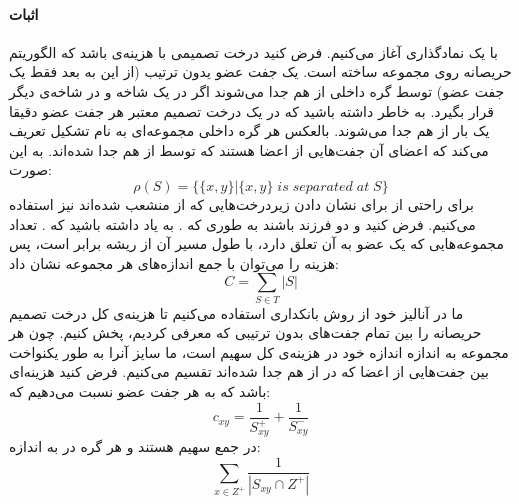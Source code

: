 \documentclass[a4paper]{article}
\begin{document}
	\paragraph{اثبات}
	با یک نمادگذاری آغاز می‌کنیم. فرض کنید 
	درخت تصمیمی با هزینه‌ی
	باشد که الگوریتم حریصانه روی مجموعه
	ساخته است. یک جفت عضو یدون ترتیب
	(از این به بعد فقط یک جفت عضو) توسط گره داخلی 
	از هم جدا می‌شوند اگر 
	در یک شاخه و
	در شاخه‌ی دیگر قرار بگیرد. به خاطر داشته باشید که در یک درخت تصمیم معتبر هر جفت عضو دقیقا یک بار از هم جدا می‌شوند. بالعکس هر گره داخلی 
	مجموعه‌ای به نام 
	تشکیل تعریف می‌کند که اعضای آن جفت‌هایی از اعضا هستند که توسط 
	از هم جدا شده‌اند. به این صورت:
	\[\rho(S) = \{\{x,y\}| \{x,y\} \; is \; separated \; at \; S\}\]
	برای راحتی از 
	برای نشان دادن زیردرخت‌هایی که از 
	منشعب شده‌اند نیز استفاده می‌کنیم.
	فرض کنید
	و
	دو فرزند
	باشند به طوری که 
	.
	به یاد داشته باشید که
	.
	تعداد مجموعه‌هایی که یک عضو به آن تعلق دارد، با طول مسیر آن از ریشه برابر است، پس هزینه
	را می‌توان با جمع اندازه‌‌های هر مجموعه
	نشان داد:
	\[C=\sum_{S\in T} |S|\]
	ما در آنالیز خود از روش بانکداری استفاده می‌کنیم تا هزینه‌ی کل درخت تصمیم حریصانه را بین تمام جفت‌های بدون ترتیبی که معرفی کردیم، پخش کنیم. چون هر مجموعه
	به اندازه اندازه خود در هزینه‌ی کل سهیم است، ما سایز آنرا به طور یکنواخت بین 
	جفت‌هایی از اعضا که در 
	از هم جدا شده‌اند تقسیم می‌کنیم. فرض کنید
	هزینه‌ای باشد که به هر جفت عضو
	نسبت می‌دهیم که:
	\[c_{xy} = \frac{1}{S^{+}_{xy}}+\frac{1}{S^{-}_{xy}}\]
	در جمع سهیم هستند و هر گره
	در 
	به اندازه:
	\[\sum_{x\in Z^+} \frac{1}{|S_{xy} \cap Z^+|}\]
\end{document}
